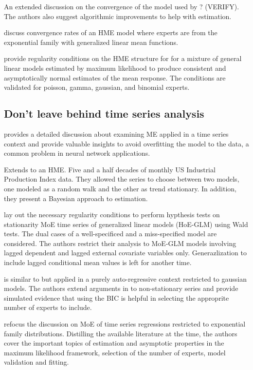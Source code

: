 \documentclass[12pt]{article}
\begin{document}
\cite{JordanXuConverge1995} An extended discussion on the convergence of the
model used by \cite{JordanJacobs1993} ? (VERIFY). The authors also suggest
algorithmic improvements to help with estimation.

\cite{JiangTanner1999} discuss convergence rates of an HME model where experts
are from the exponential family with generalized linear mean functions.

\cite{JiangTanner2000} provide regularity conditions on the HME structure for
for a mixture of general linear models estimated by maximum likelihood to
produce consistent and asymptotically normal estimates of the mean response.
The conditions are validated for poisson, gamma, gaussian, and binomial experts.


\subsection{Don't leave behind time series analysis}

\cite{WMS1995} provides a detailed discussion about examining ME applied in
a time series context and provide valuable insights to avoid overfitting the
model to the data, a common problem in neural network applications.

\cite{HuertaJiangTanner2003} Extends \cite{WMS1995} to an HME.
Five and a half decades of monthly US Industrial Production
Index data. They allowed the series to choose between two models, one modeled
as a random walk and the other as trend stationary. In addition, they present a
Bayesian approach to estimation.

\cite{CarvalhoTanner2003} lay out the necessary regularity conditions to perform
hypthesis tests on stationarity MoE time series of generalized linear models (HoE-GLM)
using Wald tests. The dual cases of a well-specificed and a miss-specified model
are considered. The authors restrict their analysis to MoE-GLM models involving
lagged dependent and lagged external covariate variables only. Generazlization to
include lagged conditional mean values is left for another time.

\cite{CarvalhoTanner2005} is similar to \cite{CarvalhoTanner2003} but applied
in a purely auto-regressive context restricted to gaussian models. The authors
extend arguments in \cite{CarvalhoTanner2003} to non-stationary series and
provide simulated evidence that using the BIC is helpful in selecting the 
approprite number of experts to include.

\cite{CarvalhoTanner2006} refocus the discussion on MoE of time series
regressions restricted to exponential family distributions. Distilling
the available literature at the time, the authors cover the important
topics of estimation and asymptotic properties in the maximum likelihood
framework, selection of the number of experts, model validation and
fitting.
\end{document}
